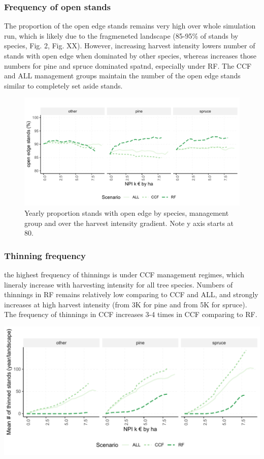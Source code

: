 \documentclass[]{elsarticle} %
\makeatletter
\def\maxwidth{\ifdim\Gin@nat@width>\linewidth\linewidth
\else\Gin@nat@width\fi}
\let\Oldincludegraphics\includegraphics
\renewcommand{\includegraphics}[1]{\Oldincludegraphics[width=\maxwidth]{#1}}
\makeatother
\begin{document}
\subsubsection{Frequency of open stands}\label{frequency-of-open-stands}

The proportion of the open edge stands remains very high over whole
simulation run, which is likely due to the fragmeneted landscape
(85-95\% of stands by species, Fig. 2, Fig. XX). However, increasing
harvest intensity lowers number of stands with open edge when dominated
by other species, whereas increases those numbers for pine and spruce
dominated spatnd, especially under RF. The CCF and ALL management groups
maintain the number of the open edge stands similar to completely set
aside stands.

\begin{figure}
\centering
\includegraphics{test_manus_files/figure-latex/fig_6_count_open_edge-1.pdf}
\caption{Yearly proportion stands with open edge by species, management
group and over the harvest intensity gradient. Note y axis starts at
80.}
\end{figure}

\subsubsection{Thinning frequency}\label{thinning-frequency}

the highest frequency of thinnings is under CCF management regimes,
which lineraly increase with harvesting intensity for all tree species.
Numbers of thinnings in RF remains relatively low comparing to CCF and
ALL, and strongly increases at high harvest intensity (from 3K for pine
and from 5K for spruce). The frequency of thinnings in CCF increases 3-4
times in CCF comparing to RF.

\includegraphics{test_manus_files/figure-latex/unnamed-chunk-2-1.pdf}
\end{document}
